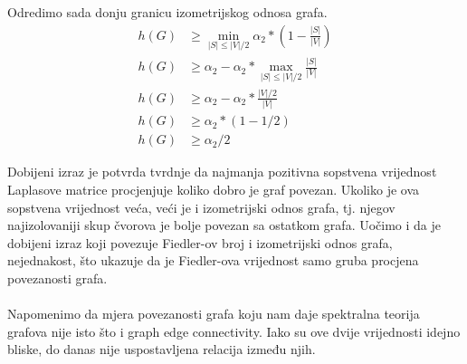 \documentclass[11pt]{article}
\begin{document}
		Odredimo sada donju granicu izometrijskog odnosa grafa.
		\[
		\begin{split}
			h(G) & \geq \min_{|S| \leq |V| / 2}  \alpha_2 * ( 1 - \frac{|S|}{|V|}) \\ 
			h(G) & \geq \alpha_2  - \alpha_2 * \max_{|S| \leq |V| / 2} \frac{|S|}{|V|} \\ 
			h(G) & \geq \alpha_2  - \alpha_2 * \frac{|V|/2}{|V|} \\ 
			h(G) & \geq \alpha_2  * (1 - 1/2) \\ 
			h(G) & \geq \alpha_2 / 2  
		\end{split}
		\]

            Dobijeni izraz je potvrda tvrdnje da najmanja pozitivna sopstvena vrijednost Laplasove matrice procjenjuje koliko dobro je graf povezan.
            Ukoliko je ova sopstvena vrijednost veća, veći je i izometrijski odnos grafa, tj. njegov najizolovaniji skup čvorova je bolje povezan sa ostatkom grafa.
			Uočimo i da je dobijeni izraz koji povezuje Fiedler-ov broj i izometrijski odnos grafa, nejednakost, što ukazuje da je Fiedler-ova vrijednost samo gruba procjena povezanosti grafa. 

		\paragraph{}
		Napomenimo da mjera povezanosti grafa koju nam daje spektralna teorija grafova nije isto što i graph edge connectivity.
		Iako su ove dvije vrijednosti idejno bliske, do danas nije uspostavljena relacija između njih.
	
\end{document}
